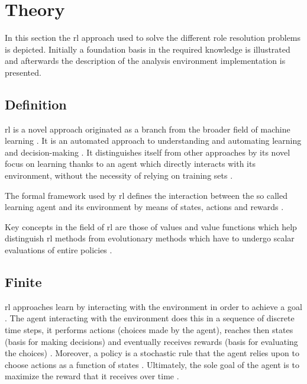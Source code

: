 \documentclass[draft=false]{seal_thesis}
\begin{document}
\section{ Theory}
\label{sec:rl_theory}

In this section the \gls{rl} approach used to solve the different role resolution problems is depicted. Initially a foundation basis in the required knowledge is illustrated and afterwards the description of the analysis environment implementation is presented.

\subsection{ Definition}

\gls{rl} is a novel approach originated as a branch from the broader field of machine learning \citep{Sutton2017}. It is an automated approach to understanding and automating learning and decision-making \citep[p. 15]{Sutton2017}. It distinguishes itself from other approaches by its novel focus on learning thanks to an agent which directly interacts with its environment, without the necessity of relying on training sets \citep[p. 15]{Sutton2017}.

The formal framework used by \gls{rl} defines the interaction between the so called learning agent and its environment by means of states, actions and rewards \citep[p. 15]{Sutton2017}.

Key concepts in the field of \gls{rl} are those of values and value functions which help distinguish \gls{rl} methods from evolutionary methods which have to undergo scalar evaluations of entire policies \citep[p. 15]{Sutton2017}.

\subsection{Finite }

\gls{rl} approaches learn by interacting with the environment in order to achieve a goal \citep{Sutton2017}. The agent interacting with the environment does this in a sequence of discrete time steps, it performs actions (choices made by the agent), reaches then states (basis for making decisions) and eventually receives rewards (basis for evaluating the choices) \citep[p. 73]{Sutton2017}. Moreover, a policy is a stochastic rule that the agent relies upon to choose actions as a function of states \citep[p. 73]{Sutton2017}. Ultimately, the sole goal of the agent is to maximize the reward that it receives over time \citep[p. 73]{Sutton2017}.
\end{document}
